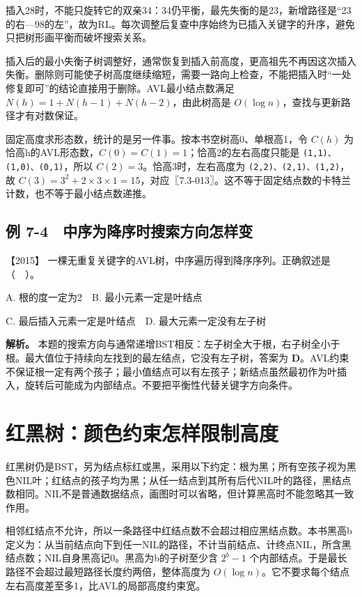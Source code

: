 插入28时，不能只旋转它的双亲34：34仍平衡，最先失衡的是23，新增路径是``23的右---98的左''，故为RL。每次调整后复查中序始终为已插入关键字的升序，避免只把树形画平衡而破坏搜索关系。

插入后的最小失衡子树调整好，通常恢复到插入前高度，更高祖先不再因这次插入失衡。删除则可能使子树高度继续缩短，需要一路向上检查，不能把插入时``一处修复即可''的结论直接用于删除。AVL最小结点数满足 \(N(h)=1+N(h-1)+N(h-2)\)，由此树高是 \(O(\log n)\)，查找与更新路径才有对数保证。

固定高度求形态数，统计的是另一件事。按本书空树高0、单根高1，令 \(C(h)\) 为恰高h的AVL形态数，\(C(0)=C(1)=1\)；恰高2的左右高度只能是 \allowbreak{}\texttt{(1,}\allowbreak{}\texttt{1)、(1,}\allowbreak{}\texttt{0)、(0,}\allowbreak{}\texttt{1)}，所以 \(C(2)=3\)。恰高3时，左右高度为 \allowbreak{}\texttt{(2,}\allowbreak{}\texttt{2)、(2,}\allowbreak{}\texttt{1)、(1,}\allowbreak{}\texttt{2)}，故 \(C(3)=3^2+2\times3\times1=15\)，对应〖7.3-013〗。这不等于固定结点数的卡特兰计数，也不等于最小结点数递推。

\subsection{例 7-4　中序为降序时搜索方向怎样变}\label{ds-ex7-4}

\noindent{}【2015】 一棵无重复关键字的AVL树，中序遍历得到降序序列。正确叙述是（　）。

A. 根的度一定为2　B. 最小元素一定是叶结点

C. 最后插入元素一定是叶结点　D. 最大元素一定没有左子树


\textbf{解析。} 本题的搜索方向与通常递增BST相反：左子树全大于根，右子树全小于根。最大值位于持续向左找到的最左结点，它没有左子树，答案为 \textbf{D}。AVL约束不保证根一定有两个孩子；最小值结点可以有左孩子；新结点虽然最初作为叶插入，旋转后可能成为内部结点。不要把平衡性代替关键字方向条件。

\section{红黑树：颜色约束怎样限制高度}\label{ds-07-06}

红黑树仍是BST，另为结点标红或黑，采用以下约定：根为黑；所有空孩子视为黑色NIL叶；红结点的孩子均为黑；从任一结点到其所有后代NIL叶的路径，黑结点数相同。NIL不是普通数据结点，画图时可以省略，但计算黑高时不能忽略其一致作用。

相邻红结点不允许，所以一条路径中红结点数不会超过相应黑结点数。本书黑高b定义为：从当前结点向下到任一NIL的路径，不计当前结点、计终点NIL，所含黑结点数；NIL自身黑高记0。黑高为b的子树至少含 \(2^b-1\) 个内部结点。于是最长路径不会超过最短路径长度约两倍，整体高度为 \(O(\log n)\)。它不要求每个结点左右高度差至多1，比AVL的局部高度约束宽。

